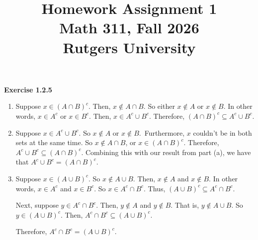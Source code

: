 \documentclass[12pt]{article}
\title{Homework Assignment 1 \\ \large Math 311, Fall 2026 \\ Rutgers University}
\author{}
\date{}
\begin{document}
\maketitle

\noindent \textbf{Exercise 1.2.5}
\begin{enumerate}
      \item [(a)]
            Suppose $x \in (A \cap B)^c$. Then, $ x \notin A \cap B $.
            So either $x \notin A$ or $x \notin B$.
            In other words, $x \in A^c$ or $x \in B^c$.
            Then, $ x \in A^c \cup B^c $.
            Therefore, $ (A \cap B)^c \subseteq A^c \cup B^c $.

      \item [(b)]
            Suppose $x \in A^c \cup B^c $. So $x \notin A$ or $x \notin B$.\
            Furthermore, $x$ couldn't be in both sets at the same time.
            So $x \notin A \cap B$, or $x \in (A \cap B)^c$.
            Therefore, $A^c \cup B^c \subseteq (A \cap B)^c$.
            Combining this with our result from part (a), we have that
            $A^c \cup B^c = (A \cap B)^c$.

      \item [(c)]
            Suppose $x \in (A \cup B)^c$. So $x \notin A \cup B$.
            Then, $x \notin A$ and $x \notin B$.
            In other words, $x \in A^c$ and $x \in B^c$.
            So $x \in A^c \cap B^c$.
            Thus, $(A \cup B)^c \subseteq A^c \cap B^c$.

            Next, suppose $y \in A^c \cap B^c$.
            Then, $y \notin A$ and $y \notin B$.
            That is, $y \notin A \cup B$.
            So $y \in (A \cup B)^c$.
            Then, $A^c \cap B^c \subseteq (A \cup B)^c $.

            Therefore, $A^c \cap B^c = (A \cup B)^c $.

\end{enumerate}
\end{document}
